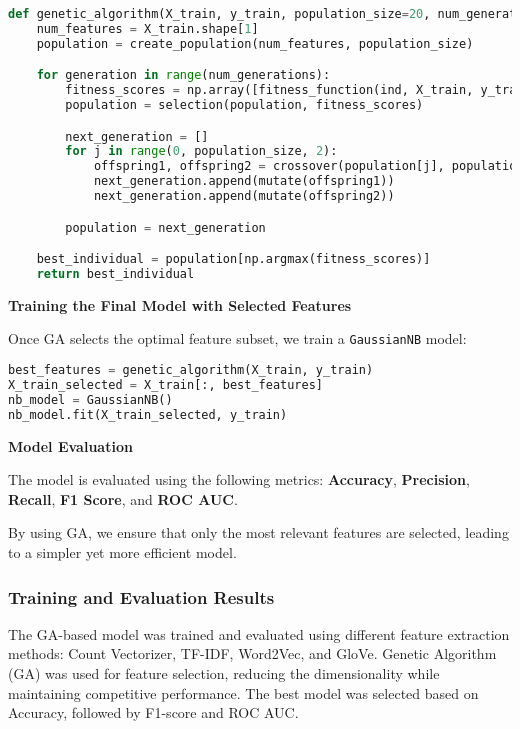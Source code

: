 \begin{lstlisting}[language=Python]
def genetic_algorithm(X_train, y_train, population_size=20, num_generations=100):
    num_features = X_train.shape[1]
    population = create_population(num_features, population_size)

    for generation in range(num_generations):
        fitness_scores = np.array([fitness_function(ind, X_train, y_train) for ind in population])
        population = selection(population, fitness_scores)

        next_generation = []
        for j in range(0, population_size, 2):
            offspring1, offspring2 = crossover(population[j], population[j + 1])
            next_generation.append(mutate(offspring1))
            next_generation.append(mutate(offspring2))

        population = next_generation

    best_individual = population[np.argmax(fitness_scores)]
    return best_individual
\end{lstlisting}

${}$\\
\textbf{Training the Final Model with Selected Features}

Once GA selects the optimal feature subset, we train a \texttt{GaussianNB} model:

\begin{lstlisting}[language=Python]
best_features = genetic_algorithm(X_train, y_train)
X_train_selected = X_train[:, best_features]
nb_model = GaussianNB()
nb_model.fit(X_train_selected, y_train)
\end{lstlisting}

${}$\\
\textbf{Model Evaluation}  

The model is evaluated using the following metrics: \textbf{Accuracy}, \textbf{Precision}, \textbf{Recall}, \textbf{F1 Score}, and \textbf{ROC AUC}.

By using GA, we ensure that only the most relevant features are selected, leading to a simpler yet more efficient model.

\subsubsection{Training and Evaluation Results}

The GA-based model was trained and evaluated using different feature extraction methods: Count Vectorizer, TF-IDF, Word2Vec, and GloVe. Genetic Algorithm (GA) was used for feature selection, reducing the dimensionality while maintaining competitive performance. The best model was selected based on Accuracy, followed by F1-score and ROC AUC.

